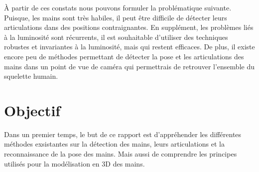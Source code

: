 À partir de ces constats nous pouvons formuler la problématique 
suivante. Puisque, 
les mains sont très habiles, il peut être difficile de détecter leurs 
articulations dans des positions contraignantes. En supplément, les 
problèmes liés à la luminosité sont récurrents, il est souhaitable 
d'utiliser des techniques robustes et invariantes à la luminosité, 
mais qui restent efficaces. De plus, il existe encore peu de méthodes 
permettant de détecter la pose et les articulations des mains dans 
un point de vue de caméra qui permettrais de retrouver l'ensemble du
squelette humain.

\section{Objectif}
%
%
%
%

Dans un premier temps, le but de ce rapport est d'appréhender les 
différentes méthodes exsistantes sur la détection des mains, leurs 
articulations et la reconnaissance de la pose des mains. Mais aussi de 
comprendre les principes utilisés pour la modélisation en 3D des 
mains.\\ 

